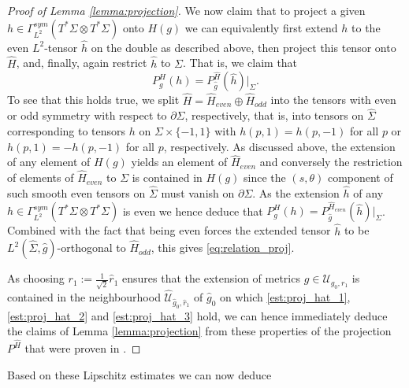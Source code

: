 \documentclass[10pt,reqno]{amsart}
\theoremstyle{plain}
\theoremstyle{definition}
\numberwithin{equation}{section}
\newcommand{\Si}{\Sigma}
\newcommand{\beq}{\begin{equation}}
\newcommand{\eeq}{\end{equation}}
\newcommand{\pSi}{{\partial \Sigma}}
\newcommand{\UU}{{\mathcal U}}
\begin{document}
\begin{proof}[Proof of Lemma \ref{lemma:projection}]
    We now claim that to project a given $h\in \Gamma^{sym}_{L^2}(T^*\Si\otimes T^*\Si)$ onto $H(g)$ we can equivalently first extend $h$ to the even $L^2$-tensor $\hat h$ on the double as described above, then project this tensor onto $\hat H$, and, finally, again restrict $\hat h$ to $\Si$. That is, we claim that
    \beq\label{eq:relation_proj}
        P_g^H(h)=P_{\hat g}^{\hat H}(\hat h)\vert _\Si.
    \eeq
    To see that this holds true, we split $\hat H=\hat H_{even}\oplus\hat H_{odd}$ into the tensors with even or odd symmetry with respect to $\partial \Si$, respectively, that is, into tensors on $\hat\Si$ corresponding to tensors $h$ on $\Si\times\{-1,1\}$ with $h(p,1)=h(p,-1)$ for all $p$ or $h(p,1)=-h(p,-1)$ for all $p$, respectively. As discussed above, the extension of any element of $H(g)$ yields an element of $\hat H_{even}$ and conversely the restriction of elements of $\hat H_{even}$ to $\Si$ is contained in $H(g)$ since the $(s,\theta)$ component of such smooth even tensors on $\hat \Si$ must vanish on $\pSi$. As the extension $\hat h$ of any $h\in  \Gamma^{sym}_{L^2}(T^*\Si\otimes T^*\Si)$ is even we hence deduce that $P_g^H(h)=P_{\hat g}^{\hat H_{even}}(\hat h)\vert_{\Si}$. Combined with the fact that being even forces the extended tensor $\hat h$ to be $L^2(\hat\Si,\hat g)$-orthogonal to $\hat H_{odd}$, this gives \eqref{eq:relation_proj}.
    
    As choosing $r_1:=\frac{1}{\sqrt{2}}\hat r_1$ ensures that the extension of metrics $g\in \UU_{g_0,r_1}$ is contained in the neighbourhood $\hat \UU_{\hat g_0,\hat r_1}$ of $\hat g_0$ on which \eqref{est:proj_hat_1}, \eqref{est:proj_hat_2} and \eqref{est:proj_hat_3} hold, we can hence immediately deduce the claims of Lemma \ref{lemma:projection} from these properties of the projection $P^{\hat H}$ that were proven in \cite{R-existence}. 
\end{proof}

Based on these Lipschitz estimates we can now deduce
\end{document}
